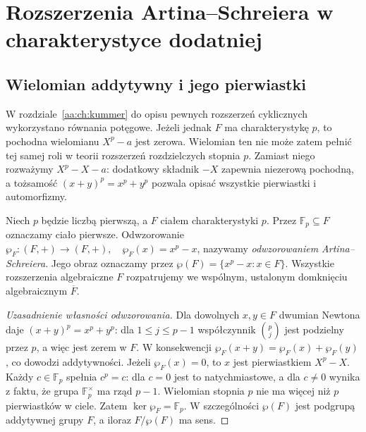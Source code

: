 \chapter[Rozszerzenia Artina--Schreiera]{Rozszerzenia Artina--Schreiera w charakterystyce dodatniej}
\label{aa:ch:artin-schreier}

\section{Wielomian addytywny i jego pierwiastki}

W rozdziale~\ref{aa:ch:kummer} do opisu pewnych rozszerzeń cyklicznych
wykorzystano równania potęgowe. Jeżeli jednak $F$ ma charakterystykę $p$,
to pochodna wielomianu $X^p-a$ jest zerowa. Wielomian ten nie może zatem
pełnić tej samej roli w teorii rozszerzeń rozdzielczych stopnia $p$.
Zamiast niego rozważymy $X^p-X-a$: dodatkowy składnik $-X$ zapewnia
niezerową pochodną, a tożsamość $(x+y)^p=x^p+y^p$ pozwala opisać
wszystkie pierwiastki i automorfizmy.

\begin{definicja}\label{aa:def:as-map}
Niech $p$ będzie liczbą pierwszą, a $F$ ciałem charakterystyki $p$.
Przez $\mathbb F_p\subseteq F$ oznaczamy ciało pierwsze. Odwzorowanie
\(\wp_F:(F,+)\longrightarrow(F,+),\quad \wp_F(x)=x^p-x\),
nazywamy \emph{odwzorowaniem Artina--Schreiera}. Jego obraz oznaczamy
przez $\wp(F)=\{x^p-x:x\in F\}$. Wszystkie rozszerzenia algebraiczne
$F$ rozpatrujemy we wspólnym, ustalonym domknięciu algebraicznym
$\overline F$.
\end{definicja}
\begin{proof}[Uzasadnienie własności odwzorowania]
Dla dowolnych $x,y\in F$ dwumian Newtona daje
\((x+y)^p=x^p+y^p\): dla $1\le j\le p-1$ współczynnik
$\binom pj$ jest podzielny przez $p$, a więc jest zerem w $F$.
W konsekwencji $\wp_F(x+y)=\wp_F(x)+\wp_F(y)$, co dowodzi
addytywności. Jeżeli $\wp_F(x)=0$, to $x$ jest pierwiastkiem
$X^p-X$. Każdy $c\in\mathbb F_p$ spełnia $c^p=c$:
dla $c=0$ jest to natychmiastowe, a dla $c\ne0$ wynika z faktu,
że grupa $\mathbb F_p^\times$ ma rząd $p-1$. Wielomian stopnia
$p$ nie ma więcej niż $p$ pierwiastków w ciele. Zatem
$\ker\wp_F=\mathbb F_p$. W szczególności $\wp(F)$ jest podgrupą
addytywnej grupy $F$, a iloraz $F/\wp(F)$ ma sens.
\end{proof}

